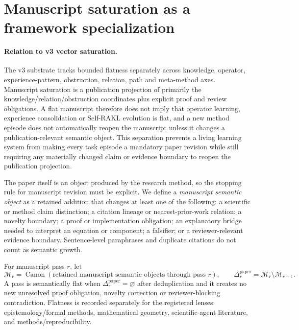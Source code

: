 \section{Manuscript saturation as a framework specialization}


\paragraph{Relation to v3 vector saturation.}
The v3 substrate tracks bounded flatness separately across knowledge, operator, experience-pattern, obstruction, relation, path and meta-method axes. Manuscript saturation is a publication projection of primarily the knowledge/relation/obstruction coordinates plus explicit proof and review obligations. A flat manuscript therefore does not imply that operator learning, experience consolidation or Self-RAKL evolution is flat, and a new method episode does not automatically reopen the manuscript unless it changes a publication-relevant semantic object. This separation prevents a living learning system from making every task episode a mandatory paper revision while still requiring any materially changed claim or evidence boundary to reopen the publication projection.

The paper itself is an object produced by the research method, so the stopping rule for manuscript revision must be explicit. We define a \emph{manuscript semantic object} as a retained addition that changes at least one of the following: a scientific or method claim distinction; a citation lineage or nearest-prior-work relation; a novelty boundary; a proof or implementation obligation; an explanatory bridge needed to interpret an equation or component; a falsifier; or a reviewer-relevant evidence boundary. Sentence-level paraphrases and duplicate citations do not count as semantic growth.

For manuscript pass \(r\), let
\[
\mathcal M_r=\operatorname{Canon}
(\text{retained manuscript semantic objects through pass }r),
\qquad
\Delta_r^{\mathrm{paper}}=\mathcal M_r\setminus\mathcal M_{r-1}.
\]
A pass is semantically flat when \(\Delta_r^{\mathrm{paper}}=\varnothing\) after deduplication and it creates no new unresolved proof obligation, novelty correction or reviewer-blocking contradiction. Flatness is recorded separately for the registered lenses: epistemology/formal methods, mathematical geometry, scientific-agent literature, and methods/reproducibility.

